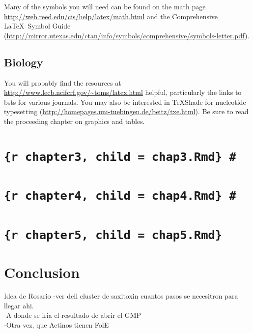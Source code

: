 \documentclass[12pt,twoside]{reedthesis}
\begin{document}
  Many of the symbols you will need can be found on the math page
  \url{http://web.reed.edu/cis/help/latex/math.html} and the Comprehensive
  \LaTeX~Symbol Guide
  (\url{http://mirror.utexas.edu/ctan/info/symbols/comprehensive/symbols-letter.pdf}).
  
  \section{Biology}\label{biology}
  
  You will probably find the resources at
  \url{http://www.lecb.ncifcrf.gov/~toms/latex.html} helpful, particularly
  the links to bsts for various journals. You may also be interested in
  TeXShade for nucleotide typesetting
  (\url{http://homepages.uni-tuebingen.de/beitz/txe.html}). Be sure to
  read the proceeding chapter on graphics and tables.
  
  \chapter{\texorpdfstring{\texttt{\{r\ chapter3,\ child\ =\ \textquotesingle{}chap3.Rmd\textquotesingle{}\}\ \#}}{\{r chapter3, child = 'chap3.Rmd'\} \#}}\label{r-chapter3-child-chap3.rmd}
  
  \chapter{\texorpdfstring{\texttt{\{r\ chapter4,\ child\ =\ \textquotesingle{}chap4.Rmd\textquotesingle{}\}\ \#}}{\{r chapter4, child = 'chap4.Rmd'\} \#}}\label{r-chapter4-child-chap4.rmd}
  
  \chapter{\texorpdfstring{\texttt{\{r\ chapter5,\ child\ =\ \textquotesingle{}chap5.Rmd\textquotesingle{}\}}}{\{r chapter5, child = 'chap5.Rmd'\}}}\label{r-chapter5-child-chap5.rmd}
  
  \chapter*{Conclusion}\label{conclusion}
  
  \setcounter{chapter}{4} \setcounter{section}{0}
  
  Idea de Rosario -ver dell cluster de saxitoxin cuantos pasos se
  necesitron para llegar ahi.\\
  -A donde se iria el resultado de abrir el GMP\\
  -Otra vez, que Actinos tienen FolE
  
\end{document}
